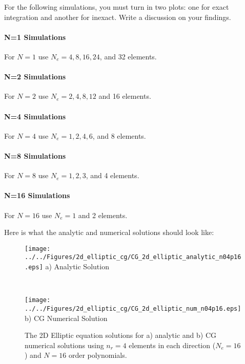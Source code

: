 \documentclass[10pt]{article}
\begin{document}
For the following simulations, you must turn in two plots: one for exact integration and another for inexact. Write a discussion 
on your findings.

\paragraph{N=1 Simulations}
For $N=1$ use $N_e=4, 8, 16, 24$, and 32 elements.

\paragraph{N=2 Simulations}
For $N=2$ use $N_e=2, 4, 8, 12$ and 16 elements.

\paragraph{N=4 Simulations}
For $N=4$ use $N_e=1, 2, 4, 6$, and 8 elements.

\paragraph{N=8 Simulations}
For $N=8$ use $N_e=1, 2, 3$, and 4 elements.

\paragraph{N=16 Simulations}
For $N=16$ use $N_e=1$ and 2 elements.

Here is what the analytic and numerical solutions should look like:
\begin{figure}[h]
\begin{center}
\begin{minipage}{2.20in}
\texttt{[image: ../../Figures/2d\_elliptic\_cg/CG\_2d\_elliptic\_analytic\_n04p16.eps]}
a) Analytic Solution
\end{minipage} \ \hspace{0.125in} \
\begin{minipage}{2.20in}
\texttt{[image: ../../Figures/2d\_elliptic\_cg/CG\_2d\_elliptic\_num\_n04p16.eps]}
b) CG Numerical Solution
\end{minipage} 
\caption{The 2D Elliptic equation solutions for a) analytic and b) CG numerical solutions using $n_r=4$ elements in each direction ($N_e=16$) and $N=16$ order 
polynomials.}
\end{center}
\end{figure}
\end{document}

